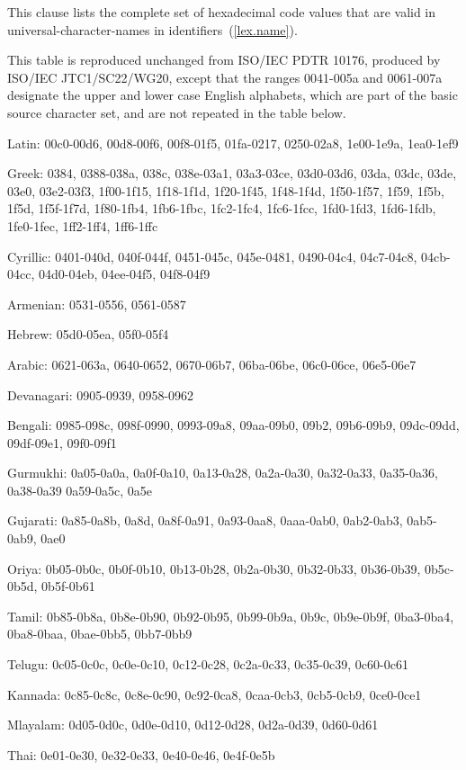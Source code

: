 
\pnum
This clause lists the complete set of hexadecimal code values that are valid in
universal-character-names in \Cpp identifiers~(\ref{lex.name}).

\pnum
This table is reproduced unchanged from ISO/IEC PDTR 10176, produced by ISO/IEC
JTC1/SC22/WG20, except that the ranges 0041-005a and 0061-007a designate the
upper and lower case English alphabets, which are part of the basic source
character set, and are not repeated in the table below.

Latin:
00c0-00d6, 00d8-00f6, 00f8-01f5, 01fa-0217, 0250-02a8, 1e00-1e9a, 1ea0-1ef9

Greek:
0384, 0388-038a, 038c, 038e-03a1, 03a3-03ce, 03d0-03d6, 03da, 03dc, 03de, 03e0,
03e2-03f3, 1f00-1f15, 1f18-1f1d, 1f20-1f45, 1f48-1f4d, 1f50-1f57, 1f59, 1f5b,
1f5d, 1f5f-1f7d, 1f80-1fb4, 1fb6-1fbc, 1fc2-1fc4, 1fc6-1fcc, 1fd0-1fd3,
1fd6-1fdb, 1fe0-1fec, 1ff2-1ff4, 1ff6-1ffc

Cyrillic:
0401-040d, 040f-044f, 0451-045c, 045e-0481, 0490-04c4, 04c7-04c8, 04cb-04cc,
04d0-04eb, 04ee-04f5, 04f8-04f9

Armenian:
0531-0556, 0561-0587

Hebrew:
05d0-05ea, 05f0-05f4

Arabic:
0621-063a, 0640-0652, 0670-06b7, 06ba-06be, 06c0-06ce, 06e5-06e7

Devanagari:
0905-0939, 0958-0962

Bengali:
0985-098c, 098f-0990, 0993-09a8, 09aa-09b0, 09b2, 09b6-09b9, 09dc-09dd,
09df-09e1, 09f0-09f1

Gurmukhi:
0a05-0a0a, 0a0f-0a10, 0a13-0a28, 0a2a-0a30, 0a32-0a33, 0a35-0a36, 0a38-0a39
0a59-0a5c, 0a5e

Gujarati:
0a85-0a8b, 0a8d, 0a8f-0a91, 0a93-0aa8, 0aaa-0ab0, 0ab2-0ab3, 0ab5-0ab9, 0ae0

Oriya:
0b05-0b0c, 0b0f-0b10, 0b13-0b28, 0b2a-0b30, 0b32-0b33, 0b36-0b39, 0b5c-0b5d,
0b5f-0b61

Tamil:
0b85-0b8a, 0b8e-0b90, 0b92-0b95, 0b99-0b9a, 0b9c, 0b9e-0b9f, 0ba3-0ba4,
0ba8-0baa, 0bae-0bb5, 0bb7-0bb9

Telugu:
0c05-0c0c, 0c0e-0c10, 0c12-0c28, 0c2a-0c33, 0c35-0c39, 0c60-0c61

Kannada:
0c85-0c8c, 0c8e-0c90, 0c92-0ca8, 0caa-0cb3, 0cb5-0cb9, 0ce0-0ce1

Mlayalam:
0d05-0d0c, 0d0e-0d10, 0d12-0d28, 0d2a-0d39, 0d60-0d61

Thai:
0e01-0e30, 0e32-0e33, 0e40-0e46, 0e4f-0e5b

